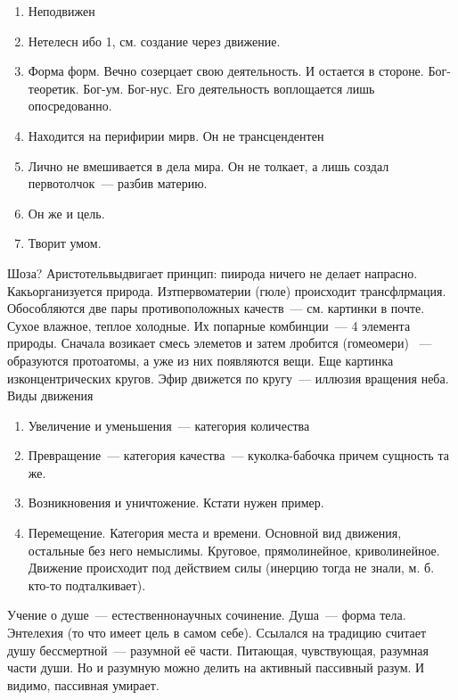 \begin{enumerate}
	\item Неподвижен
	\item Нетелесн ибо 1, см. создание через движение. 
	\item Форма форм. Вечно созерцает свою деятельность. И остается в стороне. Бог-теоретик. Бог-ум. Бог-нус. Его деятельность воплощается лишь опосредованно. 
	\item Находится на перифирии мирв. Он не трансцендентен
	\item Лично не вмешивается в дела мира. Он не толкает, а лишь создал первотолчок~--- разбив материю. 
	\item Он же и цель. 
	\item Творит умом. 
\end{enumerate}

Шоза?
Аристотельвыдвигает принцип: пиирода ничего не делает напрасно. Какьорганизуется природа. Изтпервоматерии (гюле) происходит трансфлрмация. Обособляются две пары противоположных качеств~--- см. картинки в почте. Сухое влажное, теплое холодные. Их попарные комбинции~--- 4 элемента природы. Сначала возикает смесь элеметов и затем лробится (гомеомери) ~--- образуются протоатомы, а уже из них появляются вещи. 
Еще картинка изконцентрических кругов. Эфир движется по кругу~--- иллюзия вращения неба. 
Виды движения

\begin{enumerate}
	\item Увеличение и уменьшения~--- категория количества
	\item Превращение~--- категория качества~--- куколка-бабочка причем сущность та же. 
	\item Возникновения и уничтожение. Кстати нужен пример. 
	\item Перемещение. Категория места и времени. Основной вид движения, остальные без него немыслимы. Круговое, прямолинейное, криволинейное. Движение происходит под действием силы (инерцию тогда не знали, м. б. кто-то подталкивает). 
\end{enumerate}

Учение о душе~--- естественнонаучных сочинение. Душа~--- форма тела. Энтелехия (то что имеет цель в самом себе). Ссылался на традицию считает душу бессмертной~--- разумной её части. Питающая, чувствующая, разумная части души. Но и разумную можно делить на активный пассивный разум. И видимо, пассивная умирает. 
 